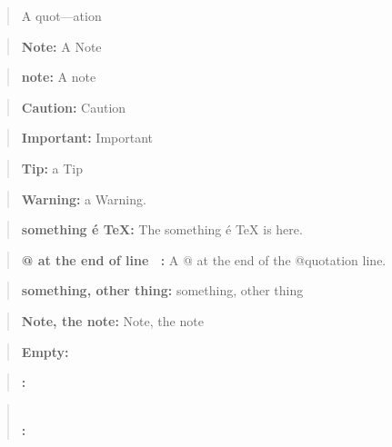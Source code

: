 \documentclass{book}
\begin{document}
\begin{quote}
A quot---ation
\end{quote}

\begin{quote}
\textbf{Note:} A Note
\end{quote}

\begin{quote}
\textbf{note:} A note
\end{quote}

\begin{quote}
\textbf{Caution:} Caution
\end{quote}

\begin{quote}
\textbf{Important:} Important
\end{quote}

\begin{quote}
\textbf{Tip:} a Tip
\end{quote}

\begin{quote}
\textbf{Warning:} a Warning.
\end{quote}

\begin{quote}
\textbf{something \'{e} \TeX{}:} The something \'{e} \TeX{} is here.
\end{quote}

\begin{quote}
\textbf{@ at the end of line \ {}:} A @ at the end of the @quotation line.
\end{quote}

\begin{quote}
\textbf{something, other thing:} something, other thing
\end{quote}

\begin{quote}
\textbf{Note, the note:} Note, the note
\end{quote}

\begin{quote}
\end{quote}

\begin{quote}
\textbf{Empty:} \end{quote}

\begin{quote}
\textbf{:} \end{quote}

\begin{quote}
\textbf{\leavevmode{}\\:} \end{quote}
\end{document}
